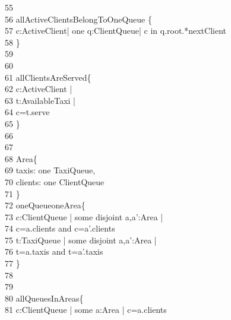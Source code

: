 \-    \ 55	\\
\-    \ 56	 allActiveClientsBelongToOneQueue \{\\
\-    \ 57	\qquad \- c:ActiveClient| {\color{blue}one} q:ClientQueue| c {\color{blue}in} q.root.*nextClient\\
\-    \ 58	\qquad \}\\
\-    \ 59	\qquad \\
\-    \ 60	\\
\-    \ 61	 allClientsAreServed\{\\
\-    \ 62	\qquad \- c:ActiveClient |\\
\-    \ 63	\qquad \- t:AvailableTaxi |\\
\-    \ 64	\qquad \-\qquad c=t.serve\\
\-    \ 65	\qquad \}\\
\-    \ 66	\qquad \\
\-    \ 67	\\
\-    \ 68	 Area\{\\
\-    \ 69	\qquad \-\qquad taxis: {\color{blue}one} TaxiQueue, \\
\-    \ 70	\qquad \-\qquad clients: {\color{blue}one} ClientQueue\\
\-    \ 71	\qquad \}\\
\-    \ 72	 oneQueueoneArea\{\\
\-    \ 73	\qquad \- c:ClientQueue | {\color{blue}some} disjoint a,a':Area | \\
\-    \ 74	\qquad \-\qquad \-\qquad c=a.clients  {\color{blue}and}  c=a'.clients\\
\-    \ 75	\qquad \- t:TaxiQueue | {\color{blue}some} disjoint a,a':Area |\\
\-    \ 76	\qquad \-\qquad \-\qquad  t=a.taxis  {\color{blue}and}  t=a'.taxis\\
\-    \ 77	\qquad \}\\
\-    \ 78	\qquad \\
\-    \ 79	\\
\-    \ 80	 allQueuesInAreas\{\\
\-    \ 81	\qquad \- c:ClientQueue | {\color{blue}some} a:Area | c=a.clients\\

